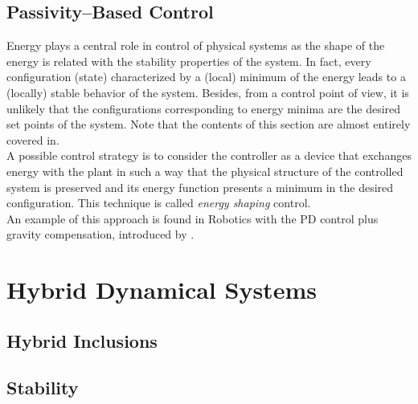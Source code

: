 \subsection{Passivity--Based Control}
%
Energy plays a central role in control of physical systems as the shape of the energy is related with the stability properties of the system. In fact, every configuration (state) characterized by a (local) minimum of the energy leads to a (locally) stable behavior of the system. Besides, from a control point of view, it is unlikely that the configurations corresponding to energy minima are the desired set points of the system. Note that the contents of this section are almost entirely covered in\cite{van2014port,secchi2007control,macchelli2003port}. \\
A possible control strategy is to consider the controller as a device that exchanges energy with the plant in such a way that the physical structure of the controlled system is preserved and its energy function presents a minimum in the desired configuration. This technique is called \textit{energy shaping} control.\\
An example of this approach is found in Robotics with the PD control plus gravity compensation, introduced by {\cite{arimoto1984stability}}.
%

\clearpage

\section{Hybrid Dynamical Systems\label{sec:HD_systems}}
%

%
\subsection{Hybrid Inclusions}

%

\subsection{Stability}

\clearpage




